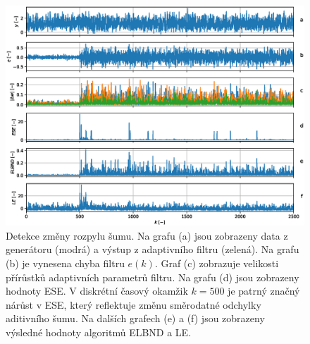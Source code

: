 \begin{figure}[ht!] 
    \centering
    \includegraphics[scale=0.60]{IMG/mdpi/noise_change.eps}
    \caption{Detekce změny rozpylu šumu. Na grafu (a) jsou zobrazeny data z generátoru (modrá) a výstup z adaptivního filtru (zelená). Na grafu (b) je vynesena chyba filtru $e(k)$. Graf (c) zobrazuje velikosti přírůstků adaptivních parametrů filtru. Na grafu (d) jsou zobrazeny hodnoty ESE. V diskrétní časový okamžik $k=500$ je patrný značný nárůst v ESE, který reflektuje změnu směrodatné odchylky aditivního šumu. Na dalších grafech (e) a (f) jsou zobrazeny výsledné hodnoty algoritmů ELBND a LE.}
    \label{fig:noise_changed}
\end{figure}

